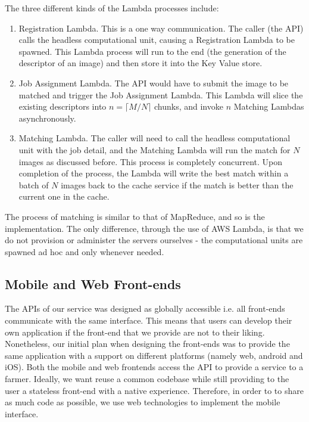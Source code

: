 The three different kinds of the Lambda processes include:

\begin{enumerate}
	\item Registration Lambda. This is a one way communication. The caller (the API) calls the headless computational unit, causing a Registration Lambda to be spawned. This Lambda process will run to the end (the generation of the descriptor of an image) and then store it into the Key Value store.
	\item Job Assignment Lambda. The API would have to submit the image to be matched and trigger the Job Assignment Lambda. This Lambda will slice the existing descriptors into $n=\lceil M / N \rceil$ chunks, and invoke $n$ Matching Lambdas asynchronously.
	\item Matching Lambda. The caller will need to call the headless computational unit with the job detail, and the Matching Lambda will run the match for $N$ images as discussed before. This process is completely concurrent. Upon completion of the process, the Lambda will write the best match within a batch of $N$ images back to the cache service if the match is better than the current one in the cache.
\end{enumerate}

The process of matching is similar to that of MapReduce, and so is the implementation. The only difference, through the use of AWS Lambda, is that we do not provision or administer the servers ourselves - the computational units are spawned ad hoc and only whenever needed.

\subsection{Mobile and Web Front-ends}

The APIs of our service was designed as globally accessible i.e. all front-ends communicate with the same interface. This means that users can develop their own application if the front-end that we provide are not to their liking. Nonetheless, our initial plan when designing the front-ends was to provide the same application with a support on different platforms (namely web, android and  iOS). Both the mobile and web frontends access the API to provide a service to a farmer. Ideally, we want reuse a common codebase while still providing to the user a stateless front-end with a native experience. Therefore, in order to to share as much code as possible, we use web technologies to implement the mobile interface.

